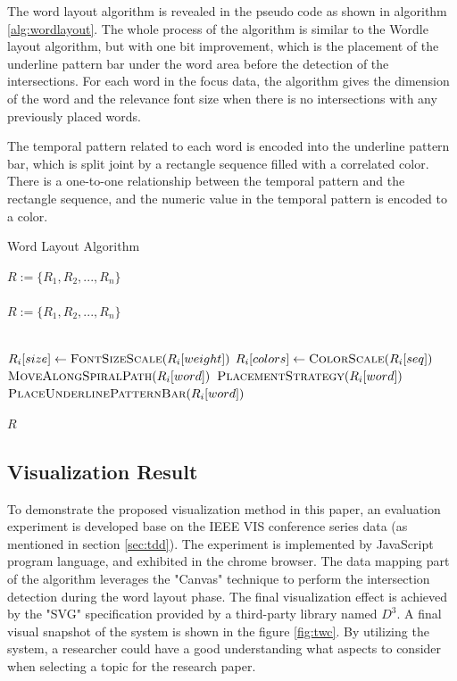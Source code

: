 \documentclass[12pt]{iopart}
\newcommand{\Desc}[2]{\State \makebox[2em][l]{#1}#2}
\begin{document}
The word layout algorithm is revealed in the pseudo code as shown in algorithm \ref{alg:wordlayout}. The whole process of the algorithm is similar to the Wordle layout algorithm, but with one bit improvement, which is the placement of the underline pattern bar under the word area before the detection of the intersections. For each word in the focus data, the algorithm gives the dimension of the word and the relevance font size when there is no intersections with any previously placed words.

The temporal pattern related to each word is encoded into the underline pattern bar, which is split joint by a rectangle sequence filled with a correlated color. There is a one-to-one relationship between the temporal pattern and the rectangle sequence, and the numeric value in the temporal pattern is encoded to a color.

\begin{algorithm}
\caption{Word Layout Algorithm}
\label{alg:wordlayout}
\begin{algorithmic}[1]
\Input
\Desc{R}{$ R := \{R_1,R_2,...,R_n\}$}\\
 \\
\EndInput
\Output
\Desc{R}{$ R := \{R_1,R_2,...,R_n\}$}\\
 \\
\EndOutput

\State $ R_i[size] \gets \Call{FontSizeScale}{R_i[weight]}$
\State $ R_i[colors] \gets \Call{ColorScale}{R_i[seq]}$
\Repeat
\State $ \Call{MoveAlongSpiralPath}{R_i[word]}$
\State $ \Call{PlacementStrategy}{R_i[word]}$
\State $ \Call{PlaceUnderlinePatternBar}{R_i[word]}$

\Return $R$
\EndFor

\EndProcedure
\end{algorithmic}
\end{algorithm}

\subsection{Visualization Result}

To demonstrate the proposed visualization method in this paper, an evaluation experiment is developed base on the IEEE VIS conference series data (as mentioned in section \ref{sec:tdd}). The experiment is implemented by JavaScript program language, and  exhibited in the chrome browser. The data mapping part of the algorithm leverages the "Canvas" technique to perform the intersection detection during the word layout phase. The final visualization effect is achieved by the "SVG" specification provided by a third-party library named $D^3$\cite{Bostock:da}. A final visual snapshot of the system is shown in the figure \ref{fig:twc}. By utilizing the system, a researcher could have a good understanding what aspects to consider when selecting a topic for the research paper. 
\end{document}
